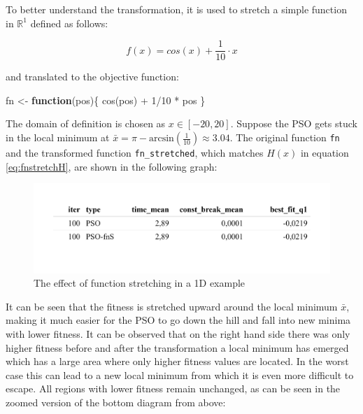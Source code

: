 \documentclass[
  oneside, a4paper, 12pt, openany]{book}
\newenvironment{Shaded}{\begin{snugshade}}{\end{snugshade}}
\newcommand{\ControlFlowTok}[1]{\textcolor[rgb]{0.13,0.29,0.53}{\textbf{#1}}}
\newcommand{\DecValTok}[1]{\textcolor[rgb]{0.00,0.00,0.81}{#1}}
\newcommand{\FunctionTok}[1]{\textcolor[rgb]{0.00,0.00,0.00}{#1}}
\newcommand{\NormalTok}[1]{#1}
\newcommand{\OtherTok}[1]{\textcolor[rgb]{0.56,0.35,0.01}{#1}}
\newcommand{\SpecialCharTok}[1]{\textcolor[rgb]{0.00,0.00,0.00}{#1}}
\theoremstyle{definition}
\theoremstyle{definition}
\theoremstyle{definition}
\theoremstyle{definition}
\theoremstyle{remark}
\begin{document}
To better understand the transformation, it is used to stretch a simple function in \(\mathbb{R}^1\) defined as follows:

\[
f(x) = cos(x)+\frac{1}{10}\cdot x
\]

and translated to the objective function:

\vspace{0.1cm}\fontsize{11}{12}\selectfont

\begin{Shaded}
\begin{Highlighting}[]
\NormalTok{fn }\OtherTok{\textless{}{-}} \ControlFlowTok{function}\NormalTok{(pos)\{}
  \FunctionTok{cos}\NormalTok{(pos) }\SpecialCharTok{+} \DecValTok{1}\SpecialCharTok{/}\DecValTok{10} \SpecialCharTok{*}\NormalTok{ pos}
\NormalTok{\}}
\end{Highlighting}
\end{Shaded}

\normalsize\vspace{0.1cm}

The domain of definition is chosen as \(x \in [-20, 20]\). Suppose the PSO gets stuck in the local minimum at \(\bar{x} = \pi - \text{arcsin}(\frac{1}{10}) \approx 3.04\). The original function \texttt{fn} and the transformed function \texttt{fn\_stretched}, which matches \(H(x)\) in equation \eqref{eq:fnstretchH}, are shown in the following graph:

\begin{figure}[H]
\includegraphics{Master_Thesis_files/figure-latex/unnamed-chunk-11-1} \caption{The effect of function stretching in a 1D example}\label{fig:unnamed-chunk-11}
\end{figure}

It can be seen that the fitness is stretched upward around the local minimum \(\bar{x}\), making it much easier for the PSO to go down the hill and fall into new minima with lower fitness. It can be observed that on the right hand side there was only higher fitness before and after the transformation a local minimum has emerged which has a large area where only higher fitness values are located. In the worst case this can lead to a new local minimum from which it is even more difficult to escape. All regions with lower fitness remain unchanged, as can be seen in the zoomed version of the bottom diagram from above:
\end{document}
